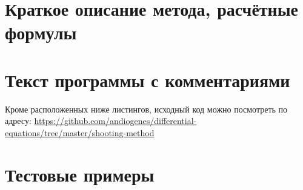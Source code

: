 \documentclass[a4paper,12pt]{article}
\begin{document}
\section{\normalsize{Краткое описание метода, расчётные формулы}}
\begin{flushleft}
\end{flushleft}


\section{\normalsize{Текст программы с комментариями}}
Кроме расположенных ниже листингов, исходный код можно посмотреть по адресу: \url{https://github.com/andiogenes/differential-equations/tree/master/shooting-method}

\section{\normalsize{Тестовые примеры}}
\begin{flushleft}
\end{flushleft}
\end{document}

